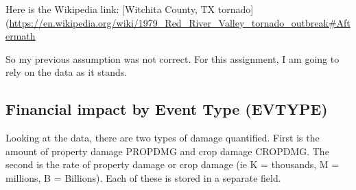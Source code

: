 \documentclass[
]{article}
\begin{document}
Here is the Wikipedia link: {[}Witchita County, TX
tornado{]}(\url{https://en.wikipedia.org/wiki/1979_Red_River_Valley_tornado_outbreak\#Aftermath}

So my previous assumption was not correct. For this assignment, I am
going to rely on the data as it stands.

\hypertarget{financial-impact-by-event-type-evtype}{%
\subsection{Financial impact by Event Type
(EVTYPE)}\label{financial-impact-by-event-type-evtype}}

Looking at the data, there are two types of damage quantified. First is
the amount of property damage PROPDMG and crop damage CROPDMG. The
second is the rate of property damage or crop damage (ie K = thousands,
M = millions, B = Billions). Each of these is stored in a separate
field.
\end{document}
